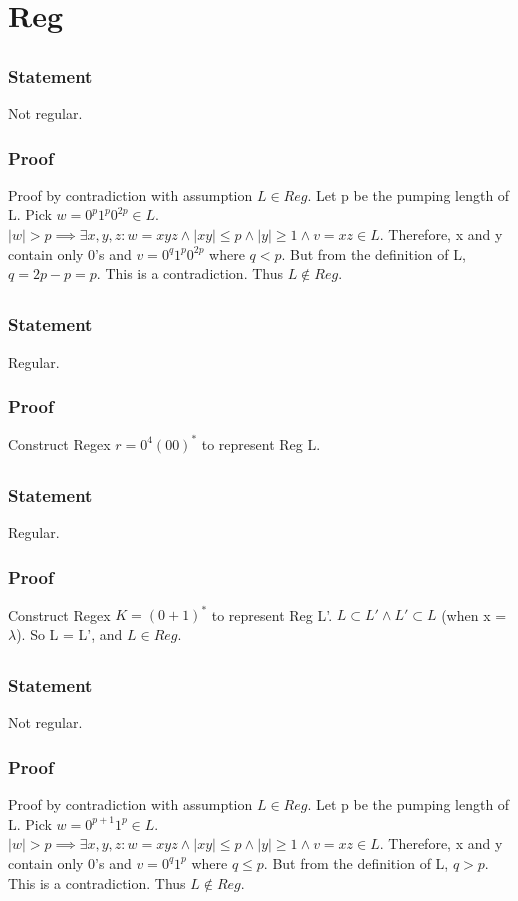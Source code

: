 \documentclass{article}
\begin{document}
\section{Reg}
\subsection{}
\subsubsection{Statement}
Not regular.
\subsubsection{Proof}
Proof by contradiction with assumption $L \in Reg$. Let p be the pumping length
of L. Pick $w = 0^p1^p0^{2p} \in L$. $\mid w \mid > p \implies \exists x, y, z
: w = xyz \land \mid xy \mid \leq p \land \mid y \mid \geq 1 \land v =
xz \in L$. Therefore, x and y contain only 0's and $ v = 0^q1^p0^{2p}$ where $q
< p$. But from the definition of L, $q = 2p - p = p$. This is a contradiction.
 Thus $L \notin Reg$.
\subsection{}
\subsubsection{Statement}
Regular.
\subsubsection{Proof}
Construct Regex $r = 0^4(00)^*$ to represent Reg L.
\subsection{}
\subsubsection{Statement}
Regular.
\subsubsection{Proof}
Construct Regex $K = (0+1)^*$ to represent Reg L'. $L \subset L' \land L'
\subset L$ (when x = $\lambda$). So L = L', and $L \in Reg$.
\subsection{}
\subsubsection{Statement}
Not regular.
\subsubsection{Proof}
Proof by contradiction with assumption $L \in Reg$. Let p be the pumping length
of L. Pick $w = 0^{p+1}1^p \in L$. $\mid w \mid > p \implies \exists x, y, z: w
= xyz \land \mid xy \mid \leq p \land \mid y \mid \geq 1 \land v = xz \in L$.
Therefore, x and y contain only 0's and $v = 0^q1^p$ where $q \leq p$. But from
the definition of L, $q > p$. This is a contradiction. Thus $L \notin Reg$.
\end{document}
